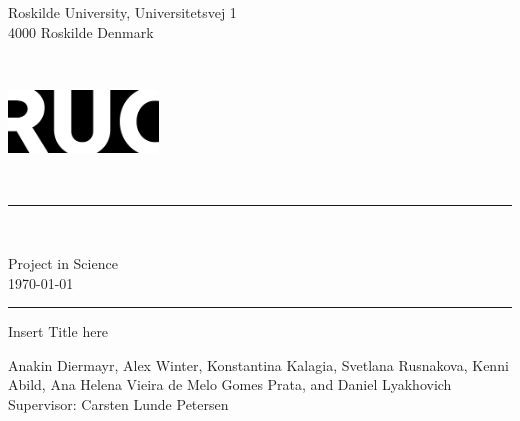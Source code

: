 \documentclass[../Orator.tex]{subfiles}
\begin{document}
\begin{titlepage}
    {\selectfont%


        \noindent
        \begin{minipage}{.45\textwidth}
            \begin{flushleft}
                Roskilde University, Universitetsvej 1\\ 4000 Roskilde Denmark
            \end{flushleft}
        \end{minipage}
        ~
        \begin{minipage}{.5\textwidth}
            \begin{flushright}
                \includegraphics[width=4cm]{Pictures/RUCLOGO.png}
            \end{flushright}
        \end{minipage}\\

        \noindent\rule{\linewidth}{0.4mm}\\
        \begin{center}
            Project in Science\\
            \today
        \end{center}
        \rule{\linewidth}{0.4mm}


        \begin{flushleft}
            \noindent
            \huge Insert Title here
        \end{flushleft}

        \noindent
        Anakin Diermayr, Alex Winter, Konstantina Kalagia, Svetlana Rusnakova, Kenni Abild, Ana Helena Vieira de Melo Gomes Prata, and Daniel Lyakhovich\\
        Supervisor: Carsten Lunde Petersen %

        \begin{figure}[H]
            \centering
        \end{figure}

    }
\end{titlepage}
\end{document}
